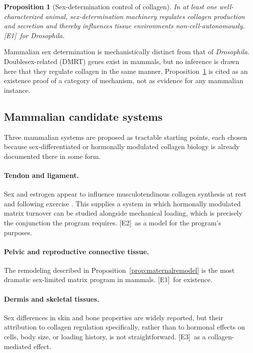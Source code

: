 \documentclass[11pt,a4paper]{article}
\theoremstyle{plain}
\newtheorem{proposition}{Proposition}[section]
\theoremstyle{definition}
\theoremstyle{remark}
\newcommand{\tier}[1]{\textup{\textsc{[#1]}}}
\newcommand{\Eone}{\tier{E1}}
\newcommand{\Etwo}{\tier{E2}}
\newcommand{\Ethree}{\tier{E3}}
\begin{document}
\begin{proposition}[Sex-determination control of collagen]\label{prop:dsx}
In at least one well-characterized animal, sex-determination machinery regulates collagen production and secretion and thereby influences tissue environments non-cell-autonomously. \Eone\ for \emph{Drosophila}.
\end{proposition}

\begin{caution}
Mammalian sex determination is mechanistically distinct from that of \emph{Drosophila}. Doublesex-related (DMRT) genes exist in mammals, but no inference is drawn here that they regulate collagen in the same manner. Proposition~\ref{prop:dsx} is cited as an existence proof of a category of mechanism, not as evidence for any mammalian instance.
\end{caution}

\subsection{Mammalian candidate systems}

Three mammalian systems are proposed as tractable starting points, each chosen because sex-differentiated or hormonally modulated collagen biology is already documented there in some form.

\paragraph{Tendon and ligament.} Sex and estrogen appear to influence musculotendinous collagen synthesis at rest and following exercise \cite{hansen2014}. This supplies a system in which hormonally modulated matrix turnover can be studied alongside mechanical loading, which is precisely the conjunction the program requires. \Etwo\ as a model for the program's purposes.

\paragraph{Pelvic and reproductive connective tissue.} The remodeling described in Proposition~\ref{prop:maternalremodel} is the most dramatic sex-limited matrix program in mammals. \Eone\ for existence.

\paragraph{Dermis and skeletal tissues.} Sex differences in skin and bone properties are widely reported, but their attribution to collagen regulation specifically, rather than to hormonal effects on cells, body size, or loading history, is not straightforward. \Ethree\ as a collagen-mediated effect.
\end{document}
